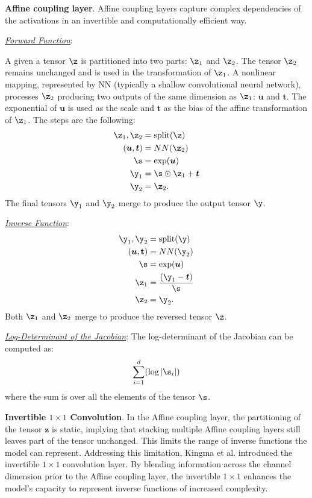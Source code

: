 \medskip

\textbf{Affine coupling layer}. Affine coupling layers \cite{Nice2014} capture complex dependencies of the activations in an invertible and computationally efficient way.

\smallskip

\textit{\underline{Forward Function}}:

A given a tensor \(\z\) is partitioned into two parts: \(\z_1\) and \(\z_2\). The tensor \(\z_2\) remains unchanged and is used in the transformation of \(\z_1\). A nonlinear mapping, represented by NN (typically a shallow convolutional neural network), processes \(\z_2\) producing two outputs of the same dimension as \(\z_1\): \(\boldsymbol{u}\) and \(\boldsymbol{t}\). The exponential of \(\boldsymbol{u}\) is used as the scale and $\boldsymbol{t}$ as the bias of the affine transformation of \(\z_1\). The steps are the following:
\begin{align*}
\z_1, \z_2 &= \text{split}(\z) \\
(\boldsymbol{u},\boldsymbol{t}) &= NN(\z_2) \\
\s &= \exp(\boldsymbol{u}) \\
\y_1 &= \s \odot \z_1 + \boldsymbol{t} \\
\y_2 &= \z_2.
\end{align*}
The final tensors \(\y_1\) and \(\y_2\) merge to produce the output tensor \(\y\).

\smallskip

\textit{\underline{Inverse Function}}:
\begin{align*}
\y_1, \y_2 &= \text{split}(\y) \\
(\boldsymbol{u},\textbf{t}) &= NN(\y_2) \\
\s &= \exp(\boldsymbol{u}) \\
\z_1 &= \frac{(\y_1 - \boldsymbol{t})}{\s} \\
\z_2 &= \y_2.
\end{align*}
Both \(\z_1\) and \(\z_2\) merge to produce the reversed tensor \(\z\).

\smallskip

\textit{\underline{Log-Determinant of the Jacobian}}: The log-determinant of the Jacobian can be computed as:
\[\sum_{i=1}^{d}(\log |\s_i|)
\]where the sum is over all the elements of the tensor $\s$.

\smallskip

\textbf{Invertible \(1 \times 1\) Convolution}.
In the Affine coupling layer, the partitioning of the tensor \(\textbf{z}\) is static, implying that stacking multiple Affine coupling layers still leaves part of the tensor unchanged. This limits the range of inverse functions the model can represent. Addressing this limitation, Kingma et al. \cite{GLOW} introduced the invertible \(1 \times 1\) convolution layer. By blending information across the channel dimension prior to the Affine coupling layer, the invertible \(1 \times 1\) enhances the model's capacity to represent inverse functions of increased complexity.

